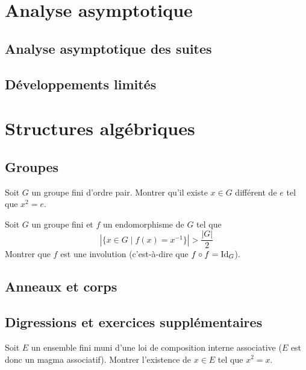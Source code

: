 \documentclass[12pt,a4paper]{exo_book}
\begin{document}
\chapter{Analyse asymptotique}

\section{Analyse asymptotique des suites}

\section{Développements limités}

\chapter{Structures algébriques}

\section{Groupes}


\begin{exo}
    
\end{exo}

\begin{exo}
    Soit $G$ un groupe fini d'ordre pair. Montrer qu'il existe $x\in G$ différent de $e$ tel que $x^2 = e$.
\end{exo}

\begin{exo}
    Soit $G$ un groupe fini et $f$ un endomorphisme de $G$ tel que
    \[|\{x \in G \mid f(x) = x^{-1}\}| > \frac{|G|}{2}\]
    Montrer que $f$ est une involution (c'est-à-dire que $f \circ f = \mathrm{Id}_G$).
\end{exo}

\section{Anneaux et corps}

\section{Digressions et exercices supplémentaires}

\begin{exo}
    Soit $E$ un ensemble fini muni d'une loi de composition interne associative ($E$ est donc un magma associatif). Montrer l'existence de $x \in E$ tel que $x^2 = x$.
\end{exo}
\end{document}

